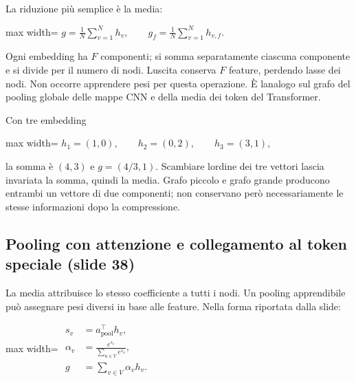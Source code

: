 \documentclass[11pt,a4paper,oneside,openany]{book}
\begin{document}
La riduzione più semplice è la media:

\begin{center}
\begin{adjustbox}{max width=\linewidth}
$\displaystyle \boxed{g=\frac1N\sum_{v=1}^Nh_v,\qquad
g_f=\frac1N\sum_{v=1}^Nh_{v,f}.}$
\end{adjustbox}
\end{center}

Ogni embedding ha \(F\) componenti; si somma separatamente ciascuna componente e si divide per il numero di nodi. L\textquotesingle uscita conserva \(F\) feature, perdendo l\textquotesingle asse dei nodi. Non occorre apprendere pesi per questa operazione. È l\textquotesingle analogo sul grafo del pooling globale delle mappe CNN e della media dei token del Transformer.

Con tre embedding

\begin{center}
\begin{adjustbox}{max width=\linewidth}
$\displaystyle h_1=(1,0),\qquad h_2=(0,2),\qquad h_3=(3,1),$
\end{adjustbox}
\end{center}

la somma è \((4,3)\) e \(g=(4/3,1)\). Scambiare l\textquotesingle ordine dei tre vettori lascia invariata la somma, quindi la media. Grafo piccolo e grafo grande producono entrambi un vettore di due componenti; non conservano però necessariamente le stesse informazioni dopo la compressione.

\subsection{Pooling con attenzione e collegamento al token speciale (slide 38)}\label{f05-n30-r718}

La media attribuisce lo stesso coefficiente a tutti i nodi. Un pooling apprendibile può assegnare pesi diversi in base alle feature. Nella forma riportata dalla slide:

\begin{center}
\begin{adjustbox}{max width=\linewidth}
$\displaystyle \begin{aligned}
s_v&=a_{\mathrm{pool}}^\top h_v,\\
\alpha_v&=\frac{e^{s_v}}{\sum_{u\in V}e^{s_u}},\\
\boxed{g}&=\boxed{\sum_{v\in V}\alpha_vh_v.}
\end{aligned}$
\end{adjustbox}
\end{center}
\end{document}

